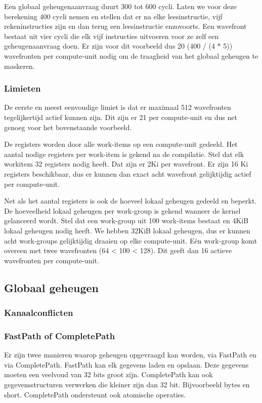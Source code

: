 Een globaal geheugenaanvraag duurt 300 tot 600 cycli. Laten we voor deze berekening 400 cycli nemen en stellen dat er na elke leesinstructie, vijf rekeninstructies zijn en dan terug een leesinstructie enzovoorts. Een wavefront bestaat uit vier cycli die elk vijf instructies uitvoeren voor ze zelf een geheugenaanvraag doen. Er zijn voor dit voorbeeld dus 20 (400 / (4 * 5)) wavefronten per compute-unit nodig om de traagheid van het globaal geheugen te maskeren.

\subsubsection{Limieten}
De eerste en meest eenvoudige limiet is dat er maximaal 512 wavefronten tegelijkertijd actief kunnen zijn. Dit zijn er 21 per compute-unit en dus net genoeg voor het bovenstaande voorbeeld.

De registers worden door alle work-items op een compute-unit gedeeld. Het aantal nodige registers per work-item is gekend na de compilatie. Stel dat elk workitem 32 registers nodig heeft. Dat zijn er 2Ki per wavefront. Er zijn 16 Ki registers beschikbaar, dus er kunnen dan exact acht wavefront gelijktijdig actief per compute-unit. 

Net als het aantal registers is ook de hoeveel lokaal geheugen gedeeld en beperkt. De hoeveelheid lokaal geheugen per work-group is gekend wanneer de kernel gelanceerd wordt. Stel dat een work-group uit 100 work-items bestaat en 4KiB lokaal geheugen nodig heeft. We hebben 32KiB lokaal geheugen, dus er kunnen acht work-groups gelijktijdig draaien op elke compute-unit. E\'en work-group komt overeen met twee wavefronten (64 < 100 < 128). Dit geeft dan 16 actieve wavefronten per compute-unit.
 

\subsection{Globaal geheugen}
\subsubsection{Kanaalconflicten}

\subsubsection{FastPath of CompletePath}
Er zijn twee manieren waarop geheugen opgevraagd kan worden, via FastPath en via CompletePath. FastPath kan elk gegevens laden en opslaan. Deze gegevens moeten een veelvoud van 32 bits groot zijn. CompletePath kan ook gegevensstructuren verwerken die kleiner zijn dan 32 bit. Bijvoorbeeld bytes en short. CompletePath ondersteunt ook atomische operaties.

